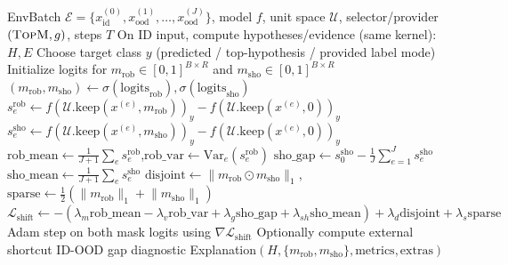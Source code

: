 \begin{algorithm}[t]
\caption{CDEA Instantiation II: Shift-Aware Robust-Shortcut Allocation}
\label{alg:cdea-shift}
\begin{algorithmic}[1]
\Require EnvBatch $\mathcal{E}=\{x^{(0)}_{\text{id}},x^{(1)}_{\text{ood}},\dots,x^{(J)}_{\text{ood}}\}$, model $f$, unit space $\mathcal{U}$, selector/provider $(\textsc{TopM}, g)$, steps $T$
\State On ID input, compute hypotheses/evidence (same kernel): $H, E$
\State Choose target class $y$ (predicted / top-hypothesis / provided label mode)
\State Initialize logits for $m_{\text{rob}} \in [0,1]^{B \times R}$ and $m_{\text{sho}} \in [0,1]^{B \times R}$
    \State $(m_{\text{rob}}, m_{\text{sho}}) \gets \sigma(\text{logits}_{\text{rob}}), \sigma(\text{logits}_{\text{sho}})$
        \State $s^{\text{rob}}_e \gets f(\mathcal{U}.\mathrm{keep}(x^{(e)},m_{\text{rob}}))_y - f(\mathcal{U}.\mathrm{keep}(x^{(e)},0))_y$
        \State $s^{\text{sho}}_e \gets f(\mathcal{U}.\mathrm{keep}(x^{(e)},m_{\text{sho}}))_y - f(\mathcal{U}.\mathrm{keep}(x^{(e)},0))_y$
    \EndFor
    \State $\mathrm{rob\_mean} \gets \frac{1}{J+1}\sum_e s^{\text{rob}}_e$,\quad $\mathrm{rob\_var} \gets \mathrm{Var}_e(s^{\text{rob}}_e)$
    \State $\mathrm{sho\_gap} \gets s^{\text{sho}}_0 - \frac{1}{J}\sum_{e=1}^{J}s^{\text{sho}}_e$
    \State $\mathrm{sho\_mean} \gets \frac{1}{J+1}\sum_e s^{\text{sho}}_e$
    \State $\mathrm{disjoint} \gets \lVert m_{\text{rob}} \odot m_{\text{sho}} \rVert_1$,\quad $\mathrm{sparse} \gets \frac{1}{2}(\lVert m_{\text{rob}} \rVert_1 + \lVert m_{\text{sho}} \rVert_1)$
    \State $\mathcal{L}_{\text{shift}} \gets -(\lambda_m\mathrm{rob\_mean}-\lambda_v\mathrm{rob\_var}+\lambda_g\mathrm{sho\_gap}+\lambda_{sh}\mathrm{sho\_mean})+\lambda_d\mathrm{disjoint}+\lambda_s\mathrm{sparse}$
    \State Adam step on both mask logits using $\nabla \mathcal{L}_{\text{shift}}$
\EndFor
\State Optionally compute external shortcut ID-OOD gap diagnostic
\State \Return Explanation$(H,\{m_{\text{rob}},m_{\text{sho}}\},\text{metrics},\text{extras})$
\end{algorithmic}
\end{algorithm}
 